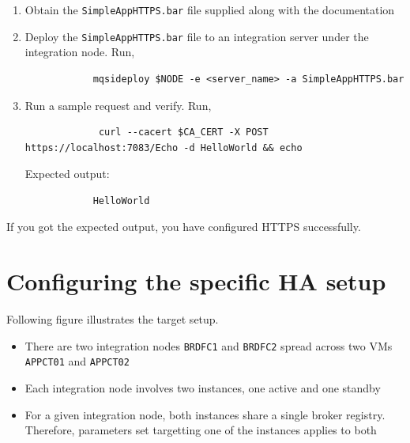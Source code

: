 \documentclass{article}
\begin{document}
    \begin{enumerate}
        \item Obtain the \texttt{SimpleAppHTTPS.bar} file supplied along with the documentation
        \item Deploy the \texttt{SimpleAppHTTPS.bar} file to an integration server under the integration node. Run,
        \begin{lstlisting}
            mqsideploy $NODE -e <server_name> -a SimpleAppHTTPS.bar
        \end{lstlisting}
        \item Run a sample request and verify. Run,
        \begin{lstlisting}
             curl --cacert $CA_CERT -X POST https://localhost:7083/Echo -d HelloWorld && echo
        \end{lstlisting}
        Expected output:
        \begin{lstlisting}
            HelloWorld
        \end{lstlisting}
    \end{enumerate}
    If you got the expected output, you have configured HTTPS successfully.
    
    \section{Configuring the specific HA setup}
    Following figure illustrates the target setup.
    \begin{itemize}
        \item There are two integration nodes \texttt{BRDFC1} and \texttt{BRDFC2} spread across two VMs \texttt{APPCT01} and \texttt{APPCT02}
        \item Each integration node involves two instances, one active and one standby
        \item For a given integration node, both instances share a single broker registry. Therefore, parameters set targetting one of the instances applies to both
    \end{itemize}
\end{document}
